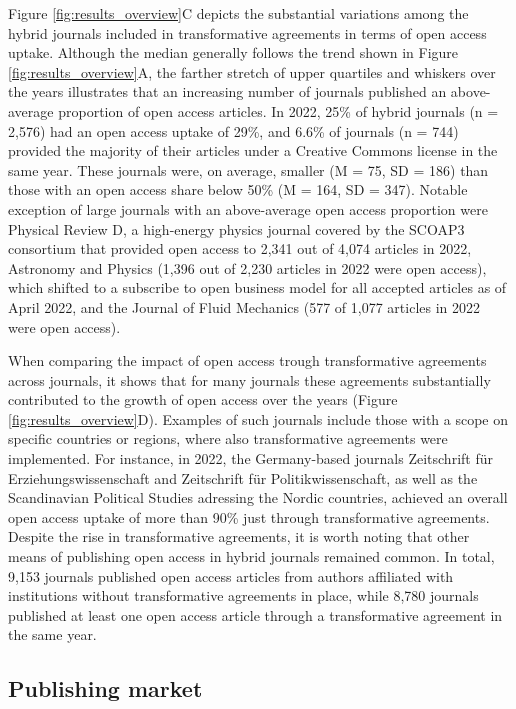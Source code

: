 \documentclass[a4paper,man,floatsintext,longtable,noextraspace,12pt]{apa6}
\begin{document}
Figure \ref{fig:results_overview}C depicts the substantial variations
among the hybrid journals included in transformative agreements in terms
of open access uptake. Although the median generally follows the trend
shown in Figure \ref{fig:results_overview}A, the farther stretch of
upper quartiles and whiskers over the years illustrates that an
increasing number of journals published an above-average proportion of
open access articles. In 2022, 25\% of hybrid journals (n = 2,576) had
an open access uptake of 29\%, and 6.6\% of journals (n = 744) provided
the majority of their articles under a Creative Commons license in the
same year. These journals were, on average, smaller (M = 75, SD = 186)
than those with an open access share below 50\% (M = 164, SD = 347).
Notable exception of large journals with an above-average open access
proportion were Physical Review D, a high-energy physics journal covered
by the SCOAP3 consortium that provided open access to 2,341 out of 4,074
articles in 2022, Astronomy and Physics (1,396 out of 2,230 articles in
2022 were open access), which shifted to a subscribe to open business
model for all accepted articles as of April 2022, and the Journal of
Fluid Mechanics (577 of 1,077 articles in 2022 were open access).

When comparing the impact of open access trough transformative
agreements across journals, it shows that for many journals these
agreements substantially contributed to the growth of open access over
the years (Figure \ref{fig:results_overview}D). Examples of such
journals include those with a scope on specific countries or regions,
where also transformative agreements were implemented. For instance, in
2022, the Germany-based journals Zeitschrift für Erziehungswissenschaft
and Zeitschrift für Politikwissenschaft, as well as the Scandinavian
Political Studies adressing the Nordic countries, achieved an overall
open access uptake of more than 90\% just through transformative
agreements. Despite the rise in transformative agreements, it is worth
noting that other means of publishing open access in hybrid journals
remained common. In total, 9,153 journals published open access articles
from authors affiliated with institutions without transformative
agreements in place, while 8,780 journals published at least one open
access article through a transformative agreement in the same year.

\hypertarget{publishing-market}{%
\subsection{Publishing market}\label{publishing-market}}
\end{document}
